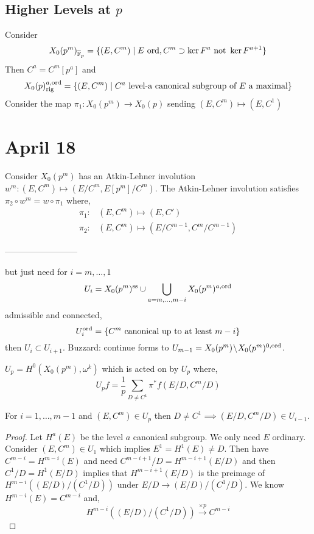 \documentclass[12pt]{article}
\begin{document}
\subsection{Higher Levels at $p$}

Consider 
\[ X_0(p^m)_{\overline{\mathbb{F}}_p} = \{ (E, C^m) \mid E \text{ ord}, C^m \supset \ker{F^a} \text{ not } \ker{F^{a+1}} \} \]
Then $C^a = C^m[p^a]$ and 
\[ X_0(p)^{a, \operatorname{\mathrm{ord}}}_{\mathrm{rig}} = \{ (E, C^m) \mid C^a \text{ level-a canonical subgroup of } E \text{ a maximal} \} \]
Consider the map  $\pi_1 : X_0(p^m) \to X_0(p)$ sending $(E, C^m) \mapsto (E, C^1)$ 


\section{April 18}

Consider $X_0(p^m)$ has an Atkin-Lehner involution $w^m : (E, C^m) \mapsto (E/C^m, E[p^m]/C^m)$. The Atkin-Lehner involution satisfies $\pi_2 \circ w^m = w \circ \pi_1$ where,
\begin{align*}
\pi_1 : & (E, C^m) \mapsto (E, C')
\\
\pi_2 : & (E, C^m) \mapsto (E/C^{m-1}, C^m /C^{m-1}) 
\end{align*}

--------------------------

but just need for $i = m,\dots, 1$
\[ U_i = X_0(p^m)^{\mathrm{ss}} \cup \bigcup_{a = m, \dots, m-i} X_0(p^m)^{a, \operatorname{\mathrm{ord}}} \]
admissible and connected,
\[ U_i^{\operatorname{\mathrm{ord}}} = \{ C^m \text{ canonical up to at least } m - i \} \]
then $U_i \subset U_{i+1}$. Buzzard: continue forms to $U_{m-1} = X_0(p^m) \! \setminus \! X_0(p^m)^{0, \operatorname{\mathrm{ord}}}$. 

\begin{defn}
$U_p = H^0(X_0(p^m), \omega^k)$ which is acted on by $U_p$ where,
\[ U_p f = \frac{1}{p} \sum_{D \neq C^1} \pi^* f (E/D, C^m/D) \]
\end{defn}

\begin{prop}
For $i = 1, \dots, m-1$ and $(E, C^m) \in U_p$ then $D \neq C^1 \implies (E/D, C^m/D) \in U_{i-1}$. 
\end{prop}

\begin{proof}
Let $H^a(E)$ be the level $a$ canonical subgroup. We only need $E$ ordinary. Consider $(E, C^m) \in U_1$ which implies $E^1 = H^1(E) \neq D$. Then have $C^{m-i} = H^{m-i}(E)$ and need $C^{m-i+1}/D = H^{m-i+1}(E/D)$ and then $C^1/D = H^1(E/D)$ implies that $H^{m-i+1}(E/D)$ is the preimage of $H^{m-i}((E/D)/(C^1/D))$ under $E/D \to (E/D)/(C^1/D)$. We know $H^{m-i}(E) = C^{m-i}$ and,
\[ H^{m-i}((E/D)/(C^1/D)) \xrightarrow{\times p} C^{m-i} \]
\end{proof}
\end{document}
